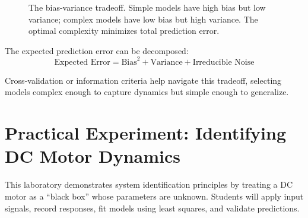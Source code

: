 \begin{figure}[htbp]
\centering
{}
\caption{The bias-variance tradeoff. Simple models have high bias but low variance; complex models have low bias but high variance. The optimal complexity minimizes total prediction error.}
\label{fig:bias_variance}
\end{figure}

The expected prediction error can be decomposed:
\begin{equation}
\text{Expected Error} = \text{Bias}^2 + \text{Variance} + \text{Irreducible Noise}
\label{eq:bias_variance}
\end{equation}

Cross-validation or information criteria help navigate this tradeoff, selecting models complex enough to capture dynamics but simple enough to generalize.

\section{Practical Experiment: Identifying DC Motor Dynamics}
\label{sec:sysid_lab}

This laboratory demonstrates system identification principles by treating a DC motor as a ``black box'' whose parameters are unknown. Students will apply input signals, record responses, fit models using least squares, and validate predictions.

